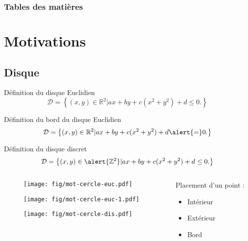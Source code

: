 \documentclass{beamer}
\begin{document}
\begin{frame}
  \frametitle{Tables des matières} %
  \setcounter{tocdepth}{1}
  \tableofcontents %
\end{frame}

\section{Motivations}

\subsection{Disque}
\begin{frame}
  {
    \begin{block}{Définition du disque Euclidien}
      $$\mathcal{D} =  \left\{ (x,y) \in \mathbb{R}^{2} |  ax + by + c(x^2 + y^2) + d \leq 0. \right\}$$
    \end{block}
  }
  {
    \begin{block}{Définition du bord du disque Euclidien}
      $$\mathcal{D} =  \left\{ (x,y) \in \mathbb{R}^{2} |  ax + by + c(x^2 + y^2) + d \alert{=} 0. \right\}$$
    \end{block}
  }  
  {
    \begin{block}{Définition du disque discret}
      $$\mathcal{D} =  \left\{ (x,y) \in \alert{\mathbb{Z}^{2}} |  ax + by + c(x^2 + y^2) + d \leq 0. \right\}$$
    \end{block}
  }
  \begin{columns}[t]
    \begin{column}{6cm}
      {
        \begin{figure}[h!]
          \centering
          \texttt{[image: fig/mot-cercle-euc.pdf]}
        \end{figure}
      }
      {
        \begin{figure}[h!]
          \centering
          \texttt{[image: fig/mot-cercle-euc-1.pdf]}
        \end{figure}
      }
      {
        \begin{figure}[h!]
          \centering
          \texttt{[image: fig/mot-cercle-dis.pdf]}
        \end{figure}
      }
      \end{column}
      \begin{column}{5cm}
        \vspace{-0.4cm}
        \begin{exampleblock}{Placement d'un point :}
          \begin{itemize}
            \item Intérieur
            \item Extérieur
            \item Bord
          \end{itemize}
        \end{exampleblock}


\end{column}
\end{columns}
\end{frame}
\end{document}
